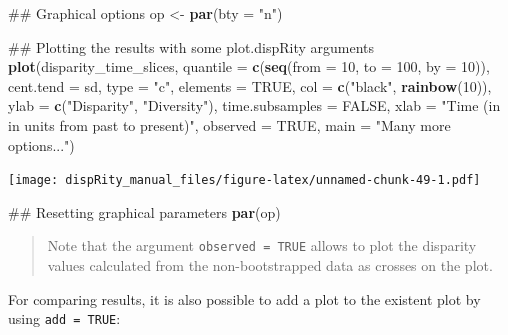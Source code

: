 \documentclass[]{book}
\newenvironment{Shaded}{\begin{snugshade}}{\end{snugshade}}
\newcommand{\KeywordTok}[1]{\textcolor[rgb]{0.13,0.29,0.53}{\textbf{#1}}}
\newcommand{\DataTypeTok}[1]{\textcolor[rgb]{0.13,0.29,0.53}{#1}}
\newcommand{\DecValTok}[1]{\textcolor[rgb]{0.00,0.00,0.81}{#1}}
\newcommand{\StringTok}[1]{\textcolor[rgb]{0.31,0.60,0.02}{#1}}
\newcommand{\OtherTok}[1]{\textcolor[rgb]{0.56,0.35,0.01}{#1}}
\newcommand{\NormalTok}[1]{#1}
\theoremstyle{definition}
\theoremstyle{definition}
\theoremstyle{remark}
\begin{document}
\begin{Shaded}
\begin{Highlighting}[]
\NormalTok{## Graphical options}
\NormalTok{op <-}\StringTok{ }\KeywordTok{par}\NormalTok{(}\DataTypeTok{bty =} \StringTok{"n"}\NormalTok{)}

\NormalTok{## Plotting the results with some plot.dispRity arguments}
\KeywordTok{plot}\NormalTok{(disparity_time_slices, }\DataTypeTok{quantile =} \KeywordTok{c}\NormalTok{(}\KeywordTok{seq}\NormalTok{(}\DataTypeTok{from =} \DecValTok{10}\NormalTok{, }\DataTypeTok{to =} \DecValTok{100}\NormalTok{, }\DataTypeTok{by =} \DecValTok{10}\NormalTok{)),}
    \DataTypeTok{cent.tend =}\NormalTok{ sd, }\DataTypeTok{type =} \StringTok{"c"}\NormalTok{, }\DataTypeTok{elements =} \OtherTok{TRUE}\NormalTok{, }\DataTypeTok{col =} \KeywordTok{c}\NormalTok{(}\StringTok{"black"}\NormalTok{, }\KeywordTok{rainbow}\NormalTok{(}\DecValTok{10}\NormalTok{)),}
    \DataTypeTok{ylab =} \KeywordTok{c}\NormalTok{(}\StringTok{"Disparity"}\NormalTok{, }\StringTok{"Diversity"}\NormalTok{), }\DataTypeTok{time.subsamples =} \OtherTok{FALSE}\NormalTok{,}
    \DataTypeTok{xlab =} \StringTok{"Time (in in units from past to present)"}\NormalTok{, }\DataTypeTok{observed =} \OtherTok{TRUE}\NormalTok{,}
    \DataTypeTok{main =} \StringTok{"Many more options..."}\NormalTok{)}
\end{Highlighting}
\end{Shaded}

\texttt{[image: dispRity\_manual\_files/figure-latex/unnamed-chunk-49-1.pdf]}

\begin{Shaded}
\begin{Highlighting}[]
\NormalTok{## Resetting graphical parameters}
\KeywordTok{par}\NormalTok{(op)}
\end{Highlighting}
\end{Shaded}

\begin{quote}
Note that the argument \texttt{observed\ =\ TRUE} allows to plot the
disparity values calculated from the non-bootstrapped data as crosses on
the plot.
\end{quote}

For comparing results, it is also possible to add a plot to the existent
plot by using \texttt{add\ =\ TRUE}:
\end{document}
